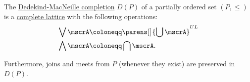\begin{theorem}\label{thm:def:dedekind_macnielle_completion}
  The \hyperref[def:dedekind_macnielle_completion]{Dedekind-MacNeille completion} \( D(P) \) of a partially ordered set \( (P, \leq) \) is a \hyperref[def:lattice]{complete lattice} with the following operations:
  \begin{align}
    \bigvee \mscrA   &\coloneqq \parens[\big]{ \bigcup \mscrA }^{UL} \label{eq:thm:def:dedekind_macnielle_completion/join} \\
    \bigwedge \mscrA &\coloneqq \bigcap \mscrA.                      \label{eq:thm:def:dedekind_macnielle_completion/meet}
  \end{align}

  Furthermore, joins and meets from \( P \) (whenever they exist) are preserved in \( D(P) \).
\end{theorem}
